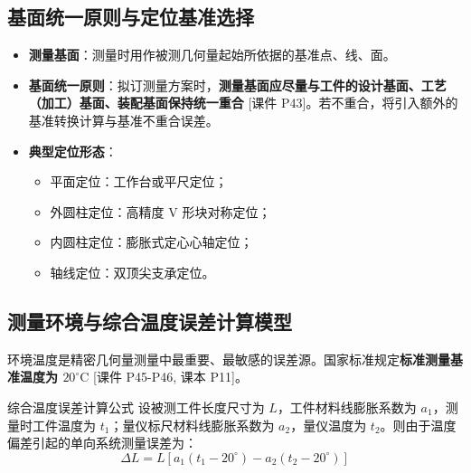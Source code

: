 \documentclass[11pt,a4paper]{ctexart}
\begin{document}
\subsection{基面统一原则与定位基准选择}
\begin{itemize}[leftmargin=1.5em, itemsep=3pt]
    \item \textbf{测量基面}：测量时用作被测几何量起始所依据的基准点、线、面。
    \item \textbf{基面统一原则}：拟订测量方案时，\textbf{测量基面应尽量与工件的设计基面、工艺（加工）基面、装配基面保持统一重合} \hfill\textsf{[课件 P43]}。若不重合，将引入额外的基准转换计算与基准不重合误差。
    \item \textbf{典型定位形态}：
    \begin{itemize}
        \item 平面定位：工作台或平尺定位；
        \item 外圆柱定位：高精度 V 形块对称定位；
        \item 内圆柱定位：膨胀式定心心轴定位；
        \item 轴线定位：双顶尖支承定位。
    \end{itemize}
\end{itemize}

\subsection{测量环境与综合温度误差计算模型}
环境温度是精密几何量测量中最重要、最敏感的误差源。国家标准规定\textbf{标准测量基准温度为 $20^\circ\mathrm{C}$} \hfill\textsf{[课件 P45-P46, 课本 P11]}。

\begin{formulabox}{综合温度误差计算公式}
设被测工件长度尺寸为 $L$，工件材料线膨胀系数为 $a_1$，测量时工件温度为 $t_1$；量仪标尺材料线膨胀系数为 $a_2$，量仪温度为 $t_2$。则由于温度偏差引起的单向系统测量误差为：
\begin{equation}
\Delta L = L \left[ a_1 (t_1 - 20^\circ) - a_2 (t_2 - 20^\circ) \right]
\end{equation}
\end{formulabox}
\end{document}
